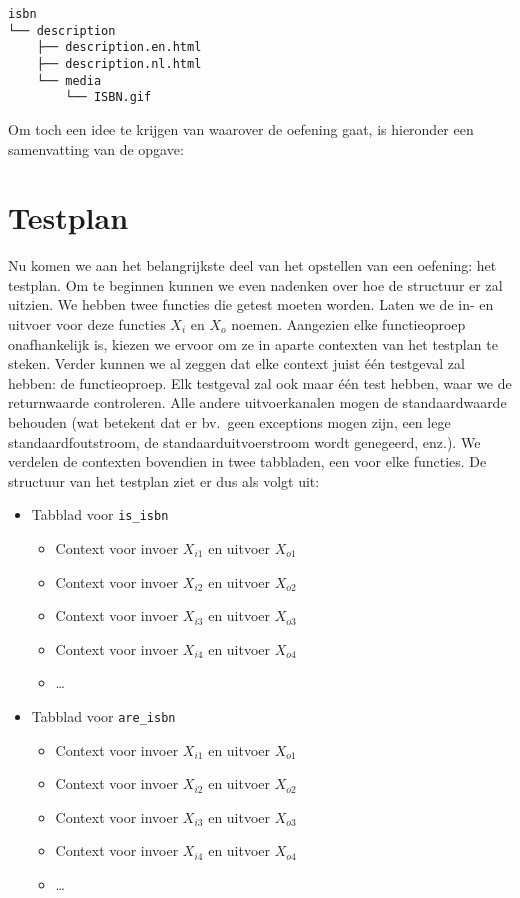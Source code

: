 \begin{verbatim}
isbn
└── description
    ├── description.en.html
    ├── description.nl.html
    └── media
        └── ISBN.gif
\end{verbatim}

Om toch een idee te krijgen van waarover de oefening gaat, is hieronder een samenvatting van de opgave:



\section{Testplan}\label{sec:isbn-testplan}

Nu komen we aan het belangrijkste deel van het opstellen van een oefening: het testplan.
Om te beginnen kunnen we even nadenken over hoe de structuur er zal uitzien.
We hebben twee functies die getest moeten worden.
Laten we de in- en uitvoer voor deze functies $X_i$ en $X_o$ noemen.
Aangezien elke functieoproep onafhankelijk is, kiezen we ervoor om ze in aparte contexten van het testplan te steken.
Verder kunnen we al zeggen dat elke context juist één testgeval zal hebben: de functieoproep.
Elk testgeval zal ook maar één test hebben, waar we de returnwaarde controleren.
Alle andere uitvoerkanalen mogen de standaardwaarde behouden (wat betekent dat er bv.\ geen exceptions mogen zijn, een lege standaardfoutstroom, de standaarduitvoerstroom wordt genegeerd, enz.).
We verdelen de contexten bovendien in twee tabbladen, een voor elke functies.
De structuur van het testplan ziet er dus als volgt uit:

\begin{itemize}
    \item Tabblad voor \texttt{is\_isbn}
           \begin{itemize}
               \item Context voor invoer $X_{i1}$ en uitvoer $X_{o1}$
               \item Context voor invoer $X_{i2}$ en uitvoer $X_{o2}$
               \item Context voor invoer $X_{i3}$ en uitvoer $X_{o3}$
               \item Context voor invoer $X_{i4}$ en uitvoer $X_{o4}$
               \item \ldots
           \end{itemize}
    \item Tabblad voor \texttt{are\_isbn}
    \begin{itemize}
        \item Context voor invoer $X_{i1}$ en uitvoer $X_{o1}$
        \item Context voor invoer $X_{i2}$ en uitvoer $X_{o2}$
        \item Context voor invoer $X_{i3}$ en uitvoer $X_{o3}$
        \item Context voor invoer $X_{i4}$ en uitvoer $X_{o4}$
        \item \ldots
    \end{itemize}
\end{itemize}

